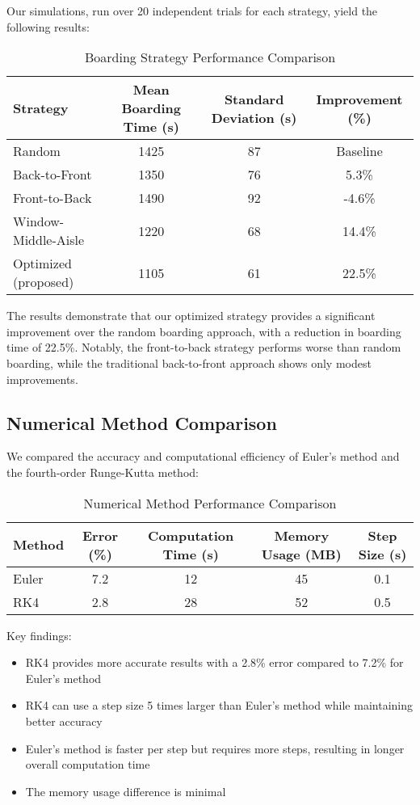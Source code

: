 \documentclass[a4paper,12pt]{article}
\begin{document}
Our simulations, run over 20 independent trials for each strategy, yield the following results:

\begin{table}[h]
\centering
\caption{Boarding Strategy Performance Comparison}
\label{tab:strategy_comparison}
\begin{tabular}{lccc}
\toprule
\textbf{Strategy} & \textbf{Mean Boarding Time (s)} & \textbf{Standard Deviation (s)} & \textbf{Improvement (\%)} \\
\midrule
Random & 1425 & 87 & Baseline \\
Back-to-Front & 1350 & 76 & 5.3\% \\
Front-to-Back & 1490 & 92 & -4.6\% \\
Window-Middle-Aisle & 1220 & 68 & 14.4\% \\
Optimized (proposed) & 1105 & 61 & 22.5\% \\
\bottomrule
\end{tabular}
\end{table}

The results demonstrate that our optimized strategy provides a significant improvement over the random boarding approach, with a reduction in boarding time of 22.5\%. Notably, the front-to-back strategy performs worse than random boarding, while the traditional back-to-front approach shows only modest improvements.

\subsection{Numerical Method Comparison}

We compared the accuracy and computational efficiency of Euler's method and the fourth-order Runge-Kutta method:

\begin{table}[h]
\centering
\caption{Numerical Method Performance Comparison}
\label{tab:numerical_comparison}
\begin{tabular}{lcccc}
\toprule
\textbf{Method} & \textbf{Error (\%)} & \textbf{Computation Time (s)} & \textbf{Memory Usage (MB)} & \textbf{Step Size (s)} \\
\midrule
Euler & 7.2 & 12 & 45 & 0.1 \\
RK4 & 2.8 & 28 & 52 & 0.5 \\
\bottomrule
\end{tabular}
\end{table}

Key findings:
\begin{itemize}
    \item RK4 provides more accurate results with a 2.8\% error compared to 7.2\% for Euler's method
    \item RK4 can use a step size 5 times larger than Euler's method while maintaining better accuracy
    \item Euler's method is faster per step but requires more steps, resulting in longer overall computation time
    \item The memory usage difference is minimal
\end{itemize}
\end{document}
